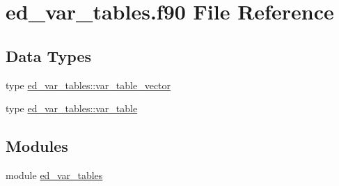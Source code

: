 \hypertarget{ed__var__tables_8f90}{}\section{ed\+\_\+var\+\_\+tables.\+f90 File Reference}
\label{ed__var__tables_8f90}
\subsection*{Data Types}
\begin{DoxyCompactItemize}
\item 
type \hyperlink{structed__var__tables_1_1var__table__vector}{ed\+\_\+var\+\_\+tables\+::var\+\_\+table\+\_\+vector}
\item 
type \hyperlink{structed__var__tables_1_1var__table}{ed\+\_\+var\+\_\+tables\+::var\+\_\+table}
\end{DoxyCompactItemize}
\subsection*{Modules}
\begin{DoxyCompactItemize}
\item 
module \hyperlink{namespaceed__var__tables}{ed\+\_\+var\+\_\+tables}
\end{DoxyCompactItemize}
